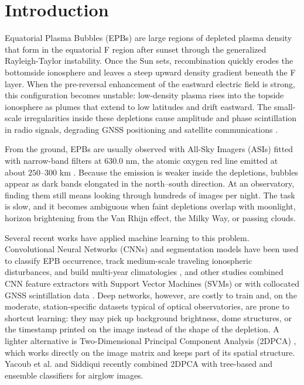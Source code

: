 \section{Introduction}\label{sec:introduction}

Equatorial Plasma Bubbles (EPBs) are large regions of depleted plasma density that form in the equatorial F region after sunset through the generalized Rayleigh-Taylor instability. Once the Sun sets, recombination quickly erodes the bottomside ionosphere and leaves a steep upward density gradient beneath the F layer. When the pre-reversal enhancement of the eastward electric field is strong, this configuration becomes unstable: low-density plasma rises into the topside ionosphere as plumes that extend to low latitudes and drift eastward. The small-scale irregularities inside these depletions cause amplitude and phase scintillation in radio signals, degrading GNSS positioning and satellite communications \cite{zhong2025automatic,okoh2025bootstrapping,githio2024machine}.

From the ground, EPBs are usually observed with All-Sky Imagers (ASIs) fitted with narrow-band filters at $630.0\text{ nm}$, the atomic oxygen red line emitted at about $250\text{--}300\text{ km}$ \cite{okoh2025bootstrapping,zhong2025automatic}. Because the emission is weaker inside the depletions, bubbles appear as dark bands elongated in the north--south direction. At an observatory, finding them still means looking through hundreds of images per night. The task is slow, and it becomes ambiguous when faint depletions overlap with moonlight, horizon brightening from the Van Rhijn effect, the Milky Way, or passing clouds.

Several recent works have applied machine learning to this problem. Convolutional Neural Networks (CNNs) and segmentation models have been used to classify EPB occurrence, track medium-scale traveling ionospheric disturbances, and build multi-year climatologies \cite{srisamoodkham2022detecting,liu2022statistical,sedlak2023analysis,okoh2025bootstrapping,zhong2025automatic,zhong2025statistical}, and other studies combined CNN feature extractors with Support Vector Machines (SVMs) or with collocated GNSS scintillation data \cite{thanakulketsarat2023classification,thanakulketsarat2023equatorial,githio2024machine}. Deep networks, however, are costly to train and, on the moderate, station-specific datasets typical of optical observatories, are prone to shortcut learning: they may pick up background brightness, dome structures, or the timestamp printed on the image instead of the shape of the depletion. A lighter alternative is Two-Dimensional Principal Component Analysis (2DPCA) \cite{yang2004two}, which works directly on the image matrix and keeps part of its spatial structure. Yacoub et al. \cite{yacoub2025automatic} and Siddiqui \cite{siddiqui2025enhanced} recently combined 2DPCA with tree-based and ensemble classifiers for airglow images.

